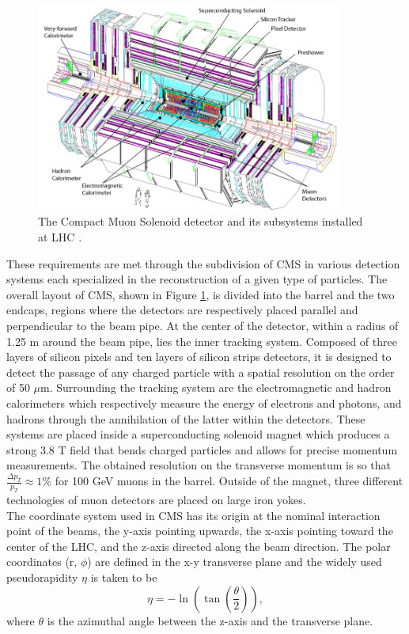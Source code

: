     \begin{figure}[t!]
      \centering
      \includegraphics[width=0.9\textwidth]{img/I-3-cms/cms.pdf}
      \caption{The Compact Muon Solenoid detector and its subsystems installed at LHC \cite{1748-0221-3-08-S08004}.}
      \label{fig:I-3-cms-global-view}
    \end{figure}

    These requirements are met through the subdivision of CMS in various detection systems each specialized in the reconstruction of a given type of particles. The overall layout of CMS, shown in Figure \ref{fig:I-3-cms-global-view}, is divided into the barrel and the two endcaps, regions where the detectors are respectively placed parallel and perpendicular to the beam pipe. At the center of the detector, within a radius of 1.25 m around the beam pipe, lies the inner tracking system. Composed of three layers of silicon pixels and ten layers of silicon strips detectors, it is designed to detect the passage of any charged particle with a spatial resolution on the order of 50 $\mu$m. Surrounding the tracking system are the electromagnetic and hadron calorimeters which respectively measure the energy of electrons and photons, and hadrons through the annihilation of the latter within the detectors. These systems are placed inside a superconducting solenoid magnet which produces a strong 3.8 T field that bends charged particles and allows for precise momentum measurements. The obtained resolution on the transverse momentum is so that $\frac{\Delta p_T}{p_T} \approx 1\% $ for 100 GeV muons in the barrel. Outside of the magnet, three different technologies of muon detectors are placed on large iron yokes. \\

    The coordinate system used in CMS has its origin at the nominal interaction point of the beams, the y-axis pointing upwards, the x-axis pointing toward the center of the LHC, and the z-axis directed along the beam direction. The polar coordinates (r, $ \phi $) are defined in the x-y transverse plane and the widely used pseudorapidity $ \eta $ is taken to be
    \begin{equation}
      \eta = - \ln\left( \tan\left( \frac{\theta}{2} \right) \right) ,
    \end{equation}
    where $ \theta $ is the azimuthal angle between the z-axis and the transverse plane.

